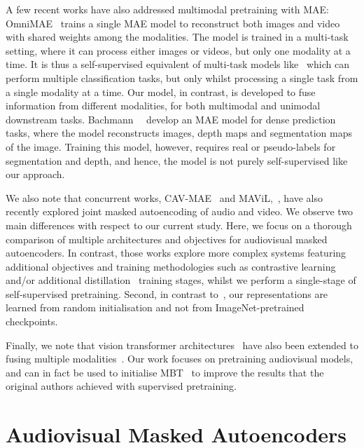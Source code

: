 \documentclass[10pt,twocolumn,letterpaper]{article}
\begin{document}
A few recent works have also addressed multimodal pretraining with MAE:
OmniMAE~\cite{girdhar2022omnimae} trains a single MAE model to reconstruct both images and video with shared weights among the modalities.
The model is trained in a multi-task setting, where it can process either images or videos, but only one modality at a time.
It is thus a self-supervised equivalent of multi-task models like~\cite{likhosherstov2021polyvit, girdhar2022omnivore} which can perform multiple classification tasks, but only whilst processing a single task from a single modality at a time.
Our model, in contrast, is developed to fuse information from different modalities, for both multimodal and unimodal downstream tasks.
Bachmann~\etal~\cite{bachmann2022multimae} develop an MAE model for dense prediction tasks, where the model reconstructs images, depth maps and segmentation maps of the image.
Training this model, however, requires real or pseudo-labels for segmentation and depth, and hence, the model is not purely self-supervised like our approach.

We also note that concurrent works, CAV-MAE~\cite{gong2022contrastive} and MAViL,~\cite{huang2022mavil}, have also recently explored joint masked autoencoding of audio and video.
We observe two main differences with respect to our current study.
Here, we focus on a thorough comparison of multiple architectures and objectives for audiovisual masked autoencoders.
In contrast, those works explore more complex systems featuring additional objectives and training methodologies such as contrastive learning~\cite{gong2022contrastive, huang2022mavil} and/or additional distillation~\cite{huang2022mavil} training stages, whilst we perform a single-stage of self-supervised pretraining.
Second, in contrast to~\cite{gong2022contrastive, huang2022mavil}, our representations are learned from random initialisation and not from ImageNet-pretrained checkpoints.

Finally, we note that vision transformer architectures~\cite{vaswani_neurips_2017, dosovitskiy_iclr_2021} have also been extended to fusing multiple modalities~\cite{nagrani2021attention,jaegle2021perceiver, ramazanova2022owl}.
Our work focuses on pretraining audiovisual models, and can in fact be used to initialise MBT~\cite{nagrani2021attention} to improve the results that the original authors achieved with supervised pretraining.




 \vspace{-0.2\baselineskip}
\section{Audiovisual Masked Autoencoders}
\label{sec:method}
\vspace{-0.2\baselineskip}
\end{document}
